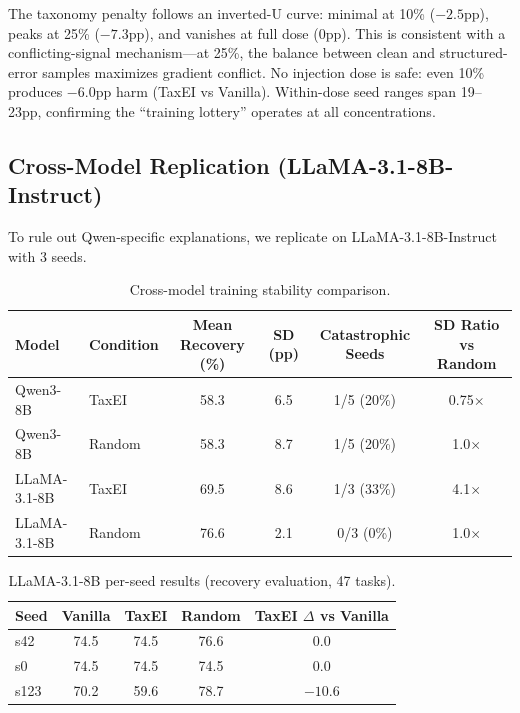 \documentclass[11pt,a4paper]{article}
\begin{document}
The taxonomy penalty follows an inverted-U curve: minimal at 10\% ($-2.5$pp), peaks at 25\% ($-7.3$pp), and vanishes at full dose (0pp). This is consistent with a conflicting-signal mechanism---at 25\%, the balance between clean and structured-error samples maximizes gradient conflict. No injection dose is safe: even 10\% produces $-6.0$pp harm (TaxEI vs Vanilla). Within-dose seed ranges span 19--23pp, confirming the ``training lottery'' operates at all concentrations.

\subsection{Cross-Model Replication (LLaMA-3.1-8B-Instruct)}
\label{sec:crossmodel}

To rule out Qwen-specific explanations, we replicate on LLaMA-3.1-8B-Instruct with 3 seeds.

\begin{table}[h]
\centering
\caption{Cross-model training stability comparison.}
\label{tab:crossmodel}
\begin{tabular}{llcccc}
\toprule
Model & Condition & Mean Recovery (\%) & SD (pp) & Catastrophic Seeds & SD Ratio vs Random \\
\midrule
Qwen3-8B & TaxEI & 58.3 & 6.5 & 1/5 (20\%) & 0.75$\times$ \\
Qwen3-8B & Random & 58.3 & 8.7 & 1/5 (20\%) & 1.0$\times$ \\
LLaMA-3.1-8B & TaxEI & 69.5 & 8.6 & 1/3 (33\%) & 4.1$\times$ \\
LLaMA-3.1-8B & Random & 76.6 & 2.1 & 0/3 (0\%) & 1.0$\times$ \\
\bottomrule
\end{tabular}
\end{table}

\begin{table}[h]
\centering
\caption{LLaMA-3.1-8B per-seed results (recovery evaluation, 47 tasks).}
\label{tab:llama_seeds}
\begin{tabular}{lcccc}
\toprule
Seed & Vanilla & TaxEI & Random & TaxEI $\Delta$ vs Vanilla \\
\midrule
s42 & 74.5 & 74.5 & 76.6 & 0.0 \\
s0 & 74.5 & 74.5 & 74.5 & 0.0 \\
s123 & 70.2 & 59.6 & 78.7 & $-10.6$ \\
\bottomrule
\end{tabular}
\end{table}
\end{document}
